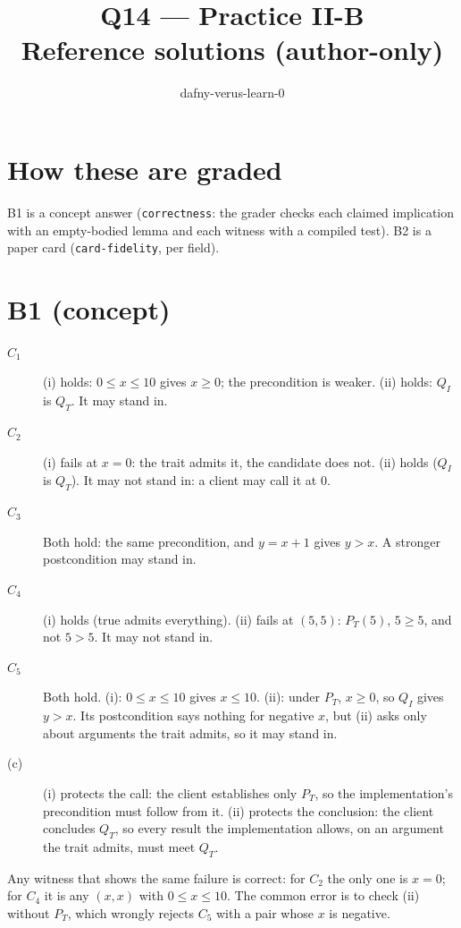 \documentclass[11pt]{article}
\title{Q14 --- Practice II-B \\ \large Reference solutions (author-only)}
\author{dafny-verus-learn-0}
\date{}
\begin{document}
\maketitle
\sloppy

\section*{How these are graded}
B1 is a concept answer (\texttt{correctness}: the grader checks each claimed
implication with an empty-bodied lemma and each witness with a compiled test).
B2 is a paper card (\texttt{card-fidelity}, per field).

\section*{B1 (concept)}

\begin{description}
\item[$C_1$] (i) holds: $0 \le x \le 10$ gives $x \ge 0$; the precondition is
  weaker. (ii) holds: $Q_I$ is $Q_T$. It may stand in.
\item[$C_2$] (i) fails at $x = 0$: the trait admits it, the candidate does
  not. (ii) holds ($Q_I$ is $Q_T$). It may not stand in: a client may call it
  at $0$.
\item[$C_3$] Both hold: the same precondition, and $y = x + 1$ gives $y > x$.
  A stronger postcondition may stand in.
\item[$C_4$] (i) holds (\textsf{true} admits everything). (ii) fails at
  $(5, 5)$: $P_T(5)$, $5 \ge 5$, and not $5 > 5$. It may not stand in.
\item[$C_5$] Both hold. (i): $0 \le x \le 10$ gives $x \le 10$. (ii): under
  $P_T$, $x \ge 0$, so $Q_I$ gives $y > x$. Its postcondition says nothing for
  negative $x$, but (ii) asks only about arguments the trait admits, so it may
  stand in.
\item[(c)] (i) protects the call: the client establishes only $P_T$, so the
  implementation's precondition must follow from it. (ii) protects the
  conclusion: the client concludes $Q_T$, so every result the implementation
  allows, on an argument the trait admits, must meet $Q_T$.
\end{description}
Any witness that shows the same failure is correct: for $C_2$ the only one
is $x = 0$; for $C_4$ it is any $(x, x)$ with $0 \le x \le 10$. The common error
is to check (ii) without $P_T$, which wrongly rejects $C_5$ with a pair whose
$x$ is negative.
\end{document}
